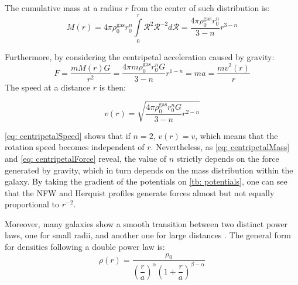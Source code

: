 		The cumulative mass at a radius $r$ from the center of such distribution is:
		\begin{equation}\label{eq: centripetalMass}
			M(r) = 4\pi\rho_0^\text{gas}r_0^n\int\limits_{0}^r \mathcal{R}^2\mathcal{R}^{-2}d\mathcal{R} = \dfrac{4\pi\rho_0^\text{gas}r_0^n}{3-n}r^{3-n}
		\end{equation}
		
		Furthermore, by considering the centripetal acceleration caused by gravity:
		\begin{equation}\label{eq: centripetalForce}
			F = \dfrac{mM(r)G}{r^2} = \dfrac{4\pi m\rho_0^\text{gas}r_0^nG}{3-n}r^{1-n} = ma = \dfrac{mv^2(r)}{r}
		\end{equation}
		The speed at a distance $r$ is then:
		
		\begin{equation}\label{eq: centripetalSpeed}
			v(r) = \sqrt{\dfrac{4\pi \rho_0^\text{gas}r_0^nG}{3-n}r^{2-n}}
		\end{equation}
		
		\autoref{eq: centripetalSpeed} shows that if $n = 2$, $v(r) = v$, which means that the rotation speed becomes independent of $r$. Nevertheless, as \autoref{eq: centripetalMass} and \autoref{eq: centripetalForce} reveal, the value of $n$ strictly depends on the force generated by gravity, which in turn depends on the mass distribution within the galaxy. By taking the gradient of the potentials on \autoref{tb: potentials}, one can see that the NFW and Herquist profiles generate forces almost but not equally proportional to $r^{-2}$.
		
		Moreover, many galaxies show a smooth transition between two distinct power laws, one for small radii, and another one for large distances \cite{binney2011galactic}. The general form for densities following a double power law is:
		\begin{equation}
			\rho(r) = \dfrac{\rho_0}{\left(\dfrac{r}{a}\right) ^ \alpha \left(1 + \dfrac{r}{a}\right) ^ {\beta - \alpha}}
		\end{equation}
		

